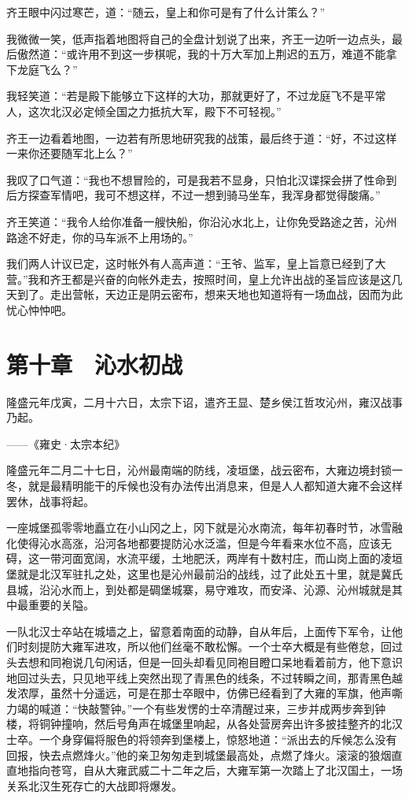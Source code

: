 齐王眼中闪过寒芒，道：“随云，皇上和你可是有了什么计策么？”

我微微一笑，低声指着地图将自己的全盘计划说了出来，齐王一边听一边点头，最后傲然道：“或许用不到这一步棋呢，我的十万大军加上荆迟的五万，难道不能拿下龙庭飞么？”

我轻笑道：“若是殿下能够立下这样的大功，那就更好了，不过龙庭飞不是平常人，这次北汉必定倾全国之力抵抗大军，殿下不可轻视。”

齐王一边看着地图，一边若有所思地研究我的战策，最后终于道：“好，不过这样一来你还要随军北上么？”

我叹了口气道：“我也不想冒险的，可是我若不显身，只怕北汉谍探会拼了性命到后方探查军情吧，我可不想这样，不过一想到骑马坐车，我浑身都觉得酸痛。”

齐王笑道：“我令人给你准备一艘快船，你沿沁水北上，让你免受路途之苦，沁州路途不好走，你的马车派不上用场的。”

我们两人计议已定，这时帐外有人高声道：“王爷、监军，皇上旨意已经到了大营。”我和齐王都是兴奋的向帐外走去，按照时间，皇上允许出战的圣旨应该是这几天到了。走出营帐，天边正是阴云密布，想来天地也知道将有一场血战，因而为此忧心忡忡吧。

\chapter{第十章　沁水初战}

隆盛元年戊寅，二月十六日，太宗下诏，遣齐王显、楚乡侯江哲攻沁州，雍汉战事乃起。

——《雍史·太宗本纪》

隆盛元年二月二十七日，沁州最南端的防线，凌垣堡，战云密布，大雍边境封锁一冬，就是最精明能干的斥候也没有办法传出消息来，但是人人都知道大雍不会这样罢休，战事将起。

一座城堡孤零零地矗立在小山冈之上，冈下就是沁水南流，每年初春时节，冰雪融化使得沁水高涨，沿河各地都要提防沁水泛滥，但是今年看来水位不高，应该无碍，这一带河面宽阔，水流平缓，土地肥沃，两岸有十数村庄，而山岗上面的凌垣堡就是北汉军驻扎之处，这里也是沁州最前沿的战线，过了此处五十里，就是冀氏县城，沿沁水而上，到处都是碉堡城寨，易守难攻，而安泽、沁源、沁州城就是其中最重要的关隘。

一队北汉士卒站在城墙之上，留意着南面的动静，自从年后，上面传下军令，让他们时刻提防大雍军进攻，所以他们丝毫不敢松懈。一个士卒大概是有些倦怠，回过头去想和同袍说几句闲话，但是一回头却看见同袍目瞪口呆地看着前方，他下意识地回过头去，只见地平线上突然出现了青黑色的线条，不过转瞬之间，那青黑色越发浓厚，虽然十分遥远，可是在那士卒眼中，仿佛已经看到了大雍的军旗，他声嘶力竭的喊道：“快敲警钟。”一个有些发愣的士卒清醒过来，三步并成两步奔到钟楼，将铜钟撞响，然后号角声在城堡里响起，从各处营房奔出许多披挂整齐的北汉士卒。一个身穿偏将服色的将领奔到堡楼上，惊怒地道：“派出去的斥候怎么没有回报，快去点燃烽火。”他的亲卫匆匆走到城堡最高处，点燃了烽火。滚滚的狼烟直直地指向苍穹，自从大雍武威二十二年之后，大雍军第一次踏上了北汉国土，一场关系北汉生死存亡的大战即将爆发。

